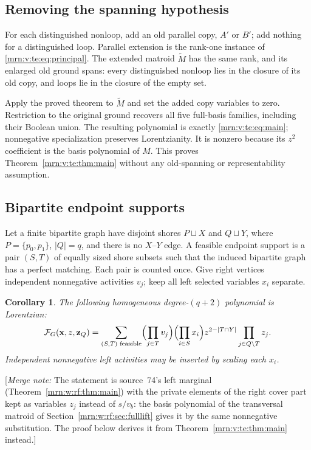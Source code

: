 \documentclass[11pt,a4paper]{article}
\newtheorem{corollary}[theorem]{Corollary}
\theoremstyle{remark}\newtheorem{remark}[theorem]{Remark}
\newcommand{\mnote}[1]{[\textit{Merge note:} #1]}
\begin{document}
\subsection{Removing the spanning hypothesis}\label{mrn:v:te:sec:padding}
For each distinguished nonloop, add an old parallel copy, $A'$ or $B'$; add nothing for a distinguished loop. Parallel extension is the rank-one instance of \eqref{mrn:v:te:eq:principal}. The extended matroid $\widetilde M$ has the same rank, and its enlarged old ground spans: every distinguished nonloop lies in the closure of its old copy, and loops lie in the closure of the empty set.

Apply the proved theorem to $\widetilde M$ and set the added copy variables to zero. Restriction to the original ground recovers all five full-basis families, including their Boolean union. The resulting polynomial is exactly \eqref{mrn:v:te:eq:main}; nonnegative specialization preserves Lorentzianity. It is nonzero because its $z^2$ coefficient is the basis polynomial of $M$. This proves Theorem~\ref{mrn:v:te:thm:main} without any old-spanning or representability assumption.

\subsection{Bipartite endpoint supports}
Let a finite bipartite graph have disjoint shores $P\sqcup X$ and $Q\sqcup Y$, where $P=\{p_0,p_1\}$, $|Q|=q$, and there is no $X$--$Y$ edge. A feasible endpoint support is a pair $(S,T)$ of equally sized shore subsets such that the induced bipartite graph has a perfect matching. Each pair is counted once. Give right vertices independent nonnegative activities $v_j$; keep all left selected variables $x_i$ separate.
\begin{corollary}\label{mrn:v:te:cor:graph}
The following homogeneous degree-$(q+2)$ polynomial is Lorentzian:
\begin{equation}\label{mrn:v:te:eq:graph}
 \mathcal F_G(\mathbf x,z,\mathbf z_Q)=
 \sum_{(S,T)\text{ feasible}}
   \Bigl(\prod_{j\in T}v_j\Bigr)\Bigl(\prod_{i\in S}x_i\Bigr)
   z^{2-|T\cap Y|}\prod_{j\in Q\setminus T}z_j.
\end{equation}
Independent nonnegative left activities may be inserted by scaling each $x_i$.
\end{corollary}
\mnote{The statement is source~74's left marginal
(Theorem~\ref{mrn:w:rf:thm:main}) with the private elements of the right cover
part kept as variables $z_j$ instead of $s/v_b$: the basis polynomial of the
transversal matroid of Section~\ref{mrn:w:rf:sec:fulllift} gives it by the same
nonnegative substitution. The proof below derives it from
Theorem~\ref{mrn:v:te:thm:main} instead.}
\end{document}
